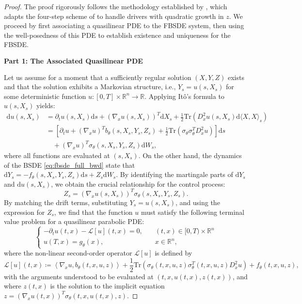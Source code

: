 \documentclass[qian]{imsart}
\newcommand{\R}{\mathbb{R}}
\newcommand{\dd}{\mathrm{d}}
\newcommand{\scpr}[2]{\left\langle #1, #2 \right\rangle}
\theoremstyle{plain}
\theoremstyle{definition}
\begin{document}
\begin{proof}
The proof rigorously follows the methodology established by \cite{Delarue2002}, which adapts the four-step scheme of \cite{MaProtterYong1994} to handle drivers with quadratic growth in $z$. We proceed by first associating a quasilinear PDE to the FBSDE system, then using the well-posedness of this PDE to establish existence and uniqueness for the FBSDE.

\textbf{Part 1: The Associated Quasilinear PDE}

Let us assume for a moment that a sufficiently regular solution $(X,Y,Z)$ exists and that the solution exhibits a Markovian structure, i.e., $Y_s = u(s, X_s)$ for some deterministic function $u:[0,T] \times \R^n \to \R$. Applying Itô's formula to $u(s,X_s)$ yields:
\begin{align*}
\dd u(s,X_s) &= \partial_t u(s,X_s)\dd s + (\nabla_x u(s,X_s))^T \dd X_s + \frac{1}{2}\mathrm{Tr}(D^2_x u(s,X_s) \dd\langle X, X\rangle_s) \\
&= \left[ \partial_t u + (\nabla_x u)^T b_\theta(s, X_s, Y_s, Z_s) + \frac{1}{2}\mathrm{Tr}(\sigma_\theta \sigma_\theta^T D^2_x u) \right] \dd s \\
&\quad+ (\nabla_x u)^T \sigma_\theta(s, X_s, Y_s, Z_s) \dd W_s,
\end{align*}
where all functions are evaluated at $(s,X_s)$.
On the other hand, the dynamics of the BSDE \eqref{eq:fbsde_full_bwd} state that $\dd Y_s = -f_\theta(s, X_s, Y_s, Z_s) \dd s + Z_s \dd W_s$. By identifying the martingale parts of $\dd Y_s$ and $\dd u(s,X_s)$, we obtain the crucial relationship for the control process:
\begin{equation}\label{eq:proof_z_pde_relation}
    Z_s = (\nabla_x u(s,X_s))^T \sigma_\theta(s, X_s, Y_s, Z_s).
\end{equation}
By matching the drift terms, substituting $Y_s = u(s, X_s)$, and using the expression for $Z_s$, we find that the function $u$ must satisfy the following terminal value problem for a quasilinear parabolic PDE:
\begin{equation}
\label{eq:pde_system_main}
\begin{cases}
    -\partial_t u(t,x) - \mathcal{L}[u](t,x) = 0, \quad &(t,x) \in [0,T) \times \R^n \\
    u(T,x) = g_\theta(x), \quad &x \in \R^n,
\end{cases}
\end{equation}
where the non-linear second-order operator $\mathcal{L}[u]$ is defined by
\[ \mathcal{L}[u](t,x) \coloneqq \scpr{\nabla_x u}{b_\theta(t,x,u,z)} + \frac{1}{2}\mathrm{Tr}(\sigma_\theta(t,x,u,z)\sigma_\theta^T(t,x,u,z) D^2_x u) + f_\theta(t,x,u,z), \]
with the arguments understood to be evaluated at $(t,x,u(t,x),z(t,x))$, and where $z(t,x)$ is the solution to the implicit equation $z = (\nabla_x u(t,x))^T \sigma_\theta(t,x,u(t,x),z)$.


\end{proof}
\end{document}
